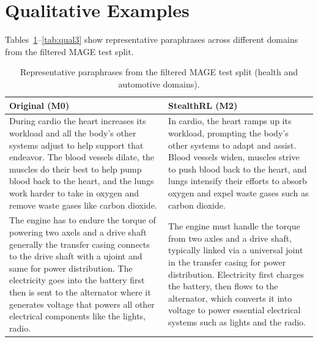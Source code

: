 \documentclass[11pt]{article}
\begin{document}
\begin{table}[H]
\centering
\small
\setlength{\tabcolsep}{3pt}
\resizebox{\textwidth}{!}{%
  
}
\caption{Full-pool stochastic repeat analysis for StealthRL (M2) at temperature 1.0 and top-p 0.9. All runs use one generation per input and no reranking; thresholds are the same 1\% FPR thresholds calibrated on human evaluation samples. Detector columns report TPR@1\%FPR.}
\label{tab:stochastic_repeats}
\end{table}

\FloatBarrier
\section{Qualitative Examples}
\label{app:examples}

Tables~\ref{tab:qual1}--\ref{tab:qual3} show representative paraphrases across different domains from the filtered MAGE test split.

\begin{table}[H]
\centering
\small
\setlength{\tabcolsep}{4pt}
\begin{tabularx}{\linewidth}{X X}
\toprule
\textbf{Original (M0)} & \textbf{StealthRL (M2)} \\
\midrule
During cardio the heart increases its workload and all the body's other systems adjust to help support that endeavor. The blood vessels dilate, the muscles do their best to help pump blood back to the heart, and the lungs work harder to take in oxygen and remove waste gases like carbon dioxide. &
In cardio, the heart ramps up its workload, prompting the body's other systems to adapt and assist. Blood vessels widen, muscles strive to push blood back to the heart, and lungs intensify their efforts to absorb oxygen and expel waste gases such as carbon dioxide. \\
\midrule
The engine has to endure the torque of powering two axels and a drive shaft generally the transfer casing connects to the drive shaft with a ujoint and same for power distribution. The electricity goes into the battery first then is sent to the alternator where it generates voltage that powers all other electrical components like the lights, radio. &
The engine must handle the torque from two axles and a drive shaft, typically linked via a universal joint in the transfer casing for power distribution. Electricity first charges the battery, then flows to the alternator, which converts it into voltage to power essential electrical systems such as lights and the radio. \\
\bottomrule
\end{tabularx}
\caption{Representative paraphrases from the filtered MAGE test split (health and automotive domains).}
\label{tab:qual1}
\end{table}
\end{document}
